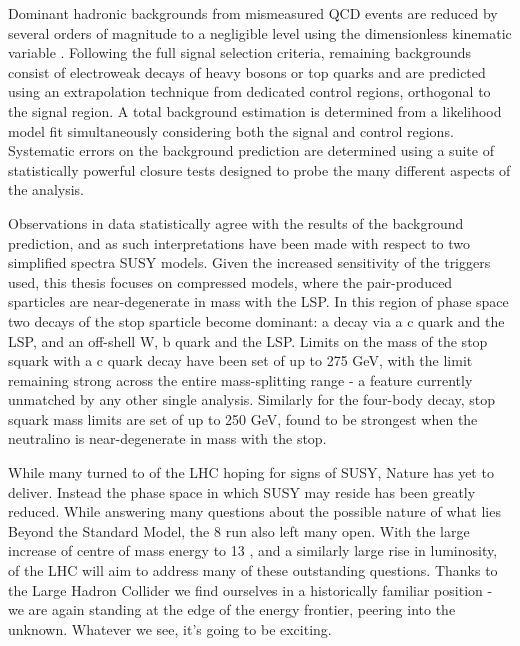 Dominant hadronic backgrounds from mismeasured QCD events are reduced by
several orders of magnitude to a negligible level using the dimensionless
kinematic variable \alphat. Following the full signal selection criteria,
remaining backgrounds consist of electroweak decays of
heavy bosons or top quarks and are predicted using an extrapolation technique
from dedicated control regions,
orthogonal to the signal region. A total background estimation is determined
from a likelihood model fit simultaneously considering both the signal and
control regions. Systematic errors on the background prediction are determined
using a suite of statistically powerful closure tests designed to probe the
many different aspects of the analysis.

Observations in data statistically agree with the results of the background
prediction, and as such interpretations have been made with respect to two
simplified spectra SUSY models. Given the increased sensitivity of the triggers
used, this thesis focuses on compressed models, where
the pair-produced sparticles are near-degenerate in mass with the LSP. In this
region of
phase space two decays of the stop sparticle become dominant: a
decay via a c quark and the LSP, and an off-shell W, b quark and the LSP.
Limits on the mass of the stop squark with a c quark decay have been set
of up to 275 GeV, with the limit remaining strong across the entire
mass-splitting
range - a feature currently unmatched by any other single analysis. Similarly
for the four-body decay, stop squark mass limits are set of up to 250 GeV, found
to be strongest when the neutralino is near-degenerate in mass with the stop.

While many turned to \runone of the LHC hoping for signs of SUSY,
Nature has yet to deliver. Instead the phase space in which SUSY may
reside has been greatly reduced. While answering many questions about
the possible nature of what lies Beyond the Standard Model, the 8
\tev run also left many open. With the large increase of centre of mass energy
to 13 \tev, and a similarly large rise in luminosity, \runtwo of the LHC will
aim to address many of these outstanding questions. Thanks to the Large Hadron
Collider we find ourselves in a historically familiar position - we are again
standing at the edge of the energy frontier, peering into the unknown. Whatever
we see, it's going to be exciting.
